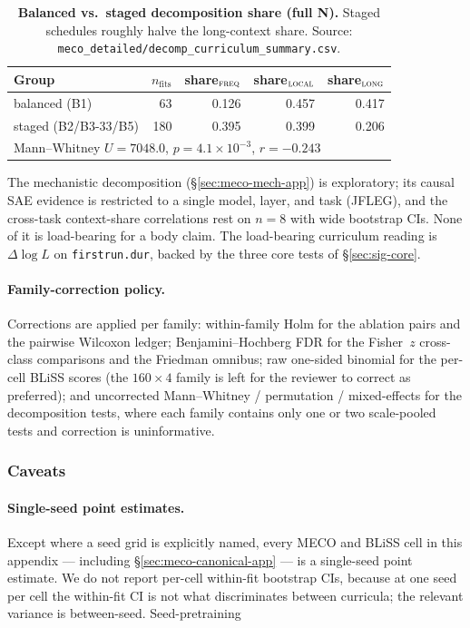 \begin{table}[!ht]
  \centering
  \small
  \caption{\textbf{Balanced vs.\ staged decomposition share (full N).} Staged schedules roughly halve the long-context share. Source: \texttt{meco\_detailed/decomp\_curriculum\_summary.csv}.}
  \label{tab:sig_decomp_curriculum}
  \begin{tabular}{lrrrr}
    \toprule
    Group & $n_\text{fits}$ & share$_\textsc{freq}$ & share$_\textsc{local}$ & share$_\textsc{long}$ \\
    \midrule
    balanced (B1)        & 63  & 0.126 & 0.457 & 0.417 \\
    staged (B2/B3-33/B5) & 180 & 0.395 & 0.399 & 0.206 \\
    \midrule
    \multicolumn{5}{l}{Mann--Whitney $U=7048.0$, $p=4.1{\times}10^{-3}$, $r=-0.243$}\\
    \bottomrule
  \end{tabular}
\end{table}

The mechanistic decomposition (\S\ref{sec:meco-mech-app}) is exploratory; its causal SAE evidence is restricted to a single model, layer, and task (JFLEG), and the cross-task context-share correlations rest on $n=8$ with wide bootstrap CIs. None of it is load-bearing for a body claim. The load-bearing curriculum reading is $\Delta\log L$ on \texttt{firstrun.dur}, backed by the three core tests of \S\ref{sec:sig-core}.

\paragraph{Family-correction policy.} Corrections are applied per family: within-family Holm for the ablation pairs and the pairwise Wilcoxon ledger; Benjamini--Hochberg FDR for the Fisher~$z$ cross-class comparisons and the Friedman omnibus; raw one-sided binomial for the per-cell BLiSS scores (the $160\times4$ family is left for the reviewer to correct as preferred); and uncorrected Mann--Whitney / permutation / mixed-effects for the decomposition tests, where each family contains only one or two scale-pooled tests and correction is uninformative. 


\subsubsection{Caveats}\label{sec:sig-uncertainty}

\paragraph{Single-seed point estimates.} Except where a seed grid is explicitly named, every MECO and BLiSS cell in this appendix --- including \S\ref{sec:meco-canonical-app} --- is a single-seed point estimate. We do not report per-cell within-fit bootstrap CIs, because at one seed per cell the within-fit CI is not what discriminates between curricula; the relevant variance is between-seed. Seed-pretraining 

